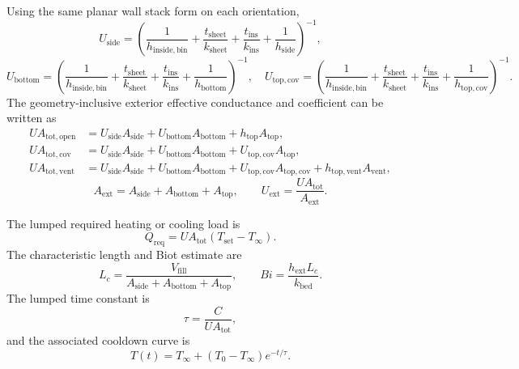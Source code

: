 \documentclass[11pt]{article}
\begin{document}
Using the same planar wall stack form on each orientation,
\begin{equation}
\label{eq:bin_orientation_u_coeffs}
U_{\mathrm{side}}=\left(\frac{1}{h_{\mathrm{inside,bin}}}+\frac{t_{\mathrm{sheet}}}{k_{\mathrm{sheet}}}+\frac{t_{\mathrm{ins}}}{k_{\mathrm{ins}}}+\frac{1}{h_{\mathrm{side}}}\right)^{-1},
\end{equation}
\begin{equation}
\label{eq:bin_orientation_u_coeffs_continued}
U_{\mathrm{bottom}}=\left(\frac{1}{h_{\mathrm{inside,bin}}}+\frac{t_{\mathrm{sheet}}}{k_{\mathrm{sheet}}}+\frac{t_{\mathrm{ins}}}{k_{\mathrm{ins}}}+\frac{1}{h_{\mathrm{bottom}}}\right)^{-1},\quad
U_{\mathrm{top,cov}}=\left(\frac{1}{h_{\mathrm{inside,bin}}}+\frac{t_{\mathrm{sheet}}}{k_{\mathrm{sheet}}}+\frac{t_{\mathrm{ins}}}{k_{\mathrm{ins}}}+\frac{1}{h_{\mathrm{top,cov}}}\right)^{-1}.
\end{equation}
The geometry-inclusive exterior effective conductance and coefficient can be written as
\begin{equation}
\label{eq:ua_tot_by_mode_detailed}
\begin{aligned}
UA_{\mathrm{tot,open}}&=U_{\mathrm{side}}A_{\mathrm{side}}+U_{\mathrm{bottom}}A_{\mathrm{bottom}}+h_{\mathrm{top}}A_{\mathrm{top}},\\
UA_{\mathrm{tot,cov}}&=U_{\mathrm{side}}A_{\mathrm{side}}+U_{\mathrm{bottom}}A_{\mathrm{bottom}}+U_{\mathrm{top,cov}}A_{\mathrm{top}},\\
UA_{\mathrm{tot,vent}}&=U_{\mathrm{side}}A_{\mathrm{side}}+U_{\mathrm{bottom}}A_{\mathrm{bottom}}+U_{\mathrm{top,cov}}A_{\mathrm{top,cov}}+h_{\mathrm{top,vent}}A_{\mathrm{vent}},
\end{aligned}
\end{equation}
\begin{equation}
\label{eq:effective_exterior_u}
A_{\mathrm{ext}}=A_{\mathrm{side}}+A_{\mathrm{bottom}}+A_{\mathrm{top}},\qquad
U_{\mathrm{ext}}=\frac{UA_{\mathrm{tot}}}{A_{\mathrm{ext}}}.
\end{equation}

The lumped required heating or cooling load is
\begin{equation}
\label{eq:lumped_required_heat}
Q_{\mathrm{req}}=UA_{\mathrm{tot}}\left(T_{\mathrm{set}}-T_\infty\right).
\end{equation}
The characteristic length and Biot estimate are
\begin{equation}
\label{eq:characteristic_length}
L_c=\frac{V_{\mathrm{fill}}}{A_{\mathrm{side}}+A_{\mathrm{bottom}}+A_{\mathrm{top}}},
\qquad
Bi=\frac{h_{\mathrm{ext}}L_c}{k_{\mathrm{bed}}}.
\end{equation}
The lumped time constant is
\begin{equation}
\label{eq:lumped_tau}
\tau=\frac{C}{UA_{\mathrm{tot}}},
\end{equation}
and the associated cooldown curve is
\begin{equation}
\label{eq:lumped_cooldown}
T(t)=T_\infty+\left(T_0-T_\infty\right)e^{-t/\tau}.
\end{equation}
\end{document}
